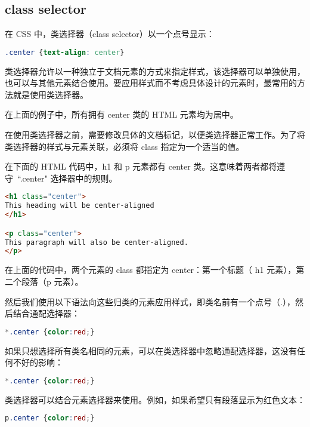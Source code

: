 \subsection{class selector}


在 CSS 中，类选择器（class selector）以一个点号显示：

\begin{lstlisting}[language=CSS]
.center {text-align: center}
\end{lstlisting}

类选择器允许以一种独立于文档元素的方式来指定样式，该选择器可以单独使用，也可以与其他元素结合使用。要应用样式而不考虑具体设计的元素时，最常用的方法就是使用类选择器。

在上面的例子中，所有拥有 center 类的 HTML 元素均为居中。

在使用类选择器之前，需要修改具体的文档标记，以便类选择器正常工作。为了将类选择器的样式与元素关联，必须将 class 指定为一个适当的值。

在下面的 HTML 代码中，h1 和 p 元素都有 center 类。这意味着两者都将遵守~``.center" 选择器中的规则。



\begin{lstlisting}[language=HTML]
<h1 class="center">
This heading will be center-aligned
</h1>

<p class="center">
This paragraph will also be center-aligned.
</p>
\end{lstlisting}


在上面的代码中，两个元素的 class 都指定为 center：第一个标题（ h1 元素），第二个段落（p 元素）。

然后我们使用以下语法向这些归类的元素应用样式，即类名前有一个点号（.），然后结合通配选择器：

\begin{lstlisting}[language=CSS]
*.center {color:red;}
\end{lstlisting}


如果只想选择所有类名相同的元素，可以在类选择器中忽略通配选择器，这没有任何不好的影响：

\begin{lstlisting}[language=CSS]
*.center {color:red;}
\end{lstlisting}


类选择器可以结合元素选择器来使用。例如，如果希望只有段落显示为红色文本：

\begin{lstlisting}[language=CSS]
p.center {color:red;}
\end{lstlisting}


